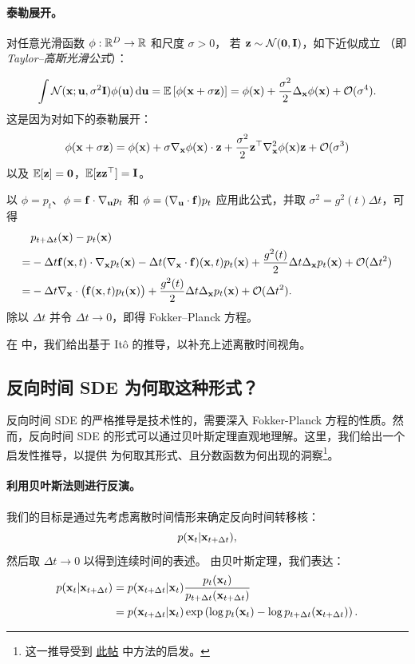 \paragraph{泰勒展开。}
对任意光滑函数 $\phi:\mathbb{R}^D\to\mathbb{R}$ 和尺度 $\sigma>0$，
若 ${\mathbf{z}}\sim\mathcal N(\bm{0},{\mathbf{I}})$，如下近似成立
（即 \emph{Taylor–高斯光滑公式}）：

\[
\int \mathcal N({\mathbf{x}};{\mathbf{u}},\sigma^2{\mathbf{I}}) \phi({\mathbf{u}}) \mathop{}\!\mathrm{d}{\mathbf{u}}
=\mathbb{E} \left[\phi({\mathbf{x}}+\sigma{\mathbf{z}})\right]
=\phi({\mathbf{x}})+\frac{\sigma^2}{2} \Delta_{\mathbf{x}}\phi({\mathbf{x}})+\mathcal O(\sigma^4).
\]
这是因为对如下的泰勒展开：
\[
\phi({\mathbf{x}}+\sigma{\mathbf{z}})=\phi({\mathbf{x}})+\sigma\nabla_{\mathbf{x}}\phi({\mathbf{x}}) \cdot {\mathbf{z}}+\frac{\sigma^2}{2}{\mathbf{z}}^\top\nabla_{\mathbf{x}}^2\phi({\mathbf{x}}){\mathbf{z}}+\mathcal O(\sigma^3)
\]
以及 $\mathbb{E}[{\mathbf{z}}]=\bm{0}$，$\mathbb{E}[{\mathbf{z}}{\mathbf{z}}^\top]={\mathbf{I}}$。

以 $\phi=p_t$、$\phi={\mathbf{f}} \cdot \nabla_{\mathbf{u}} p_t$ 和 $\phi=(\nabla_{\mathbf{u}} \cdot{\mathbf{f}}) p_t$ 应用此公式，并取 $\sigma^2=g^2(t)\Delta t$，可得
\[
\begin{aligned}
&p_{t+\Delta t}({\mathbf{x}}) - p_t({\mathbf{x}})
\\=& -\Delta t {\mathbf{f}}({\mathbf{x}},t) \cdot \nabla_{\mathbf{x}} p_t({\mathbf{x}})
-\Delta t (\nabla_{\mathbf{x}} \cdot{\mathbf{f}})({\mathbf{x}},t) p_t({\mathbf{x}})
+\frac{g^2(t)}{2}\Delta t \Delta_{\mathbf{x}} p_t({\mathbf{x}})
+\mathcal O(\Delta t^2) 
\\=&  - \Delta t \nabla_{\mathbf{x}} \cdot \big({\mathbf{f}}({\mathbf{x}},t) p_t({\mathbf{x}})\big)
 + \frac{g^2(t)}{2} \Delta t \Delta_{\mathbf{x}} p_t({\mathbf{x}})
 + \mathcal O(\Delta t^2).
\end{aligned}
\]
除以 $\Delta t$ 并令 $\Delta t\to0$，即得 Fokker–Planck 方程。

在  中，我们给出基于 It\^o 的推导，以补充上述离散时间视角。




\subsection{反向时间 SDE 为何取这种形式？}\label{subsec:reverse-sde-reason}

反向时间 SDE 的严格推导是技术性的，需要深入 Fokker-Planck 方程的性质。然而，反向时间 SDE 的形式可以通过贝叶斯定理直观地理解。这里，我们给出一个启发性推导，以提供  为何取其形式、且分数函数为何出现的洞察\footnote{这一推导受到 \href{https://alexxthiery.github.io/notes/reverse_and_tweedie/reverse_and_tweedie.html}{此帖} 中方法的启发。}。


\paragraph{利用贝叶斯法则进行反演。}
我们的目标是通过先考虑离散时间情形来确定反向时间转移核：
\[
p({\mathbf{x}}_t | {\mathbf{x}}_{t+\Delta t}),
\]
然后取 $\Delta t \rightarrow 0$ 以得到连续时间的表述。
由贝叶斯定理，我们表达：
\begin{align}\label{eq:reverse-sde-bayes-discrete}
    p({\mathbf{x}}_t | {\mathbf{x}}_{t+\Delta t}) 
    &= p({\mathbf{x}}_{t+\Delta t} | {\mathbf{x}}_t) \frac{p_t({\mathbf{x}}_t)}{p_{t+\Delta t}({\mathbf{x}}_{t+\Delta t})} \nonumber \\
    &= p({\mathbf{x}}_{t+\Delta t} | {\mathbf{x}}_t) \exp\left(\log p_t({\mathbf{x}}_t) - \log p_{t+\Delta t}({\mathbf{x}}_{t+\Delta t})\right).
\end{align}

